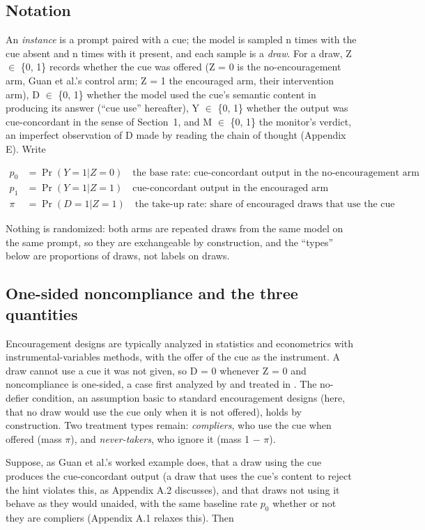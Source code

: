 \documentclass[11pt,a4paper]{article}
\begin{document}
\subsection{Notation}
An \emph{instance} is a prompt paired with a cue; the model is sampled n times with the cue absent and n times with it present, and each sample is a \emph{draw}. For a draw, Z $\in$ \{0, 1\} records whether the cue was offered (Z = 0 is the no-encouragement arm, Guan et al.’s control arm; Z = 1 the encouraged arm, their intervention arm), D $\in$ \{0, 1\} whether the model used the cue’s semantic content in producing its answer (“cue use” hereafter), Y $\in$ \{0, 1\} whether the output was cue-concordant in the sense of Section~1, and M $\in$ \{0, 1\} the monitor’s verdict, an imperfect observation of D made by reading the chain of thought (Appendix E). Write

\begin{align*}
  p_0 &= \Pr(Y = 1 | Z = 0)\quad\text{the base rate: cue-concordant output in the no-encouragement arm} \\
  p_1 &= \Pr(Y = 1 | Z = 1)\quad\text{cue-concordant output in the encouraged arm} \\
  \pi  &= \Pr(D = 1 | Z = 1)\quad\text{the take-up rate: share of encouraged draws that use the cue}
\end{align*}

Nothing is randomized: both arms are repeated draws from the same model on the same prompt, so they are exchangeable by construction, and the “types” below are proportions of draws, not labels on draws.

\subsection{One-sided noncompliance and the three quantities}
Encouragement designs are typically analyzed in statistics and econometrics with instrumental-variables methods, with the offer of the cue as the instrument. A draw cannot use a cue it was not given, so D = 0 whenever Z = 0 and noncompliance is one-sided, a case first analyzed by \citet{bloom1984accounting} and treated in \citet[ch. 23]{imbens2015causal}. The no-defier condition, an assumption basic to standard encouragement designs (here, that no draw would use the cue only when it is not offered), holds by construction. Two treatment types remain: \emph{compliers}, who use the cue when offered (mass $\pi$), and \emph{never-takers}, who ignore it (mass 1 $-$ $\pi$).

Suppose, as Guan et al.’s worked example does, that a draw using the cue produces the cue-concordant output (a draw that uses the cue’s content to reject the hint violates this, as Appendix A.2 discusses), and that draws not using it behave as they would unaided, with the same baseline rate $p_0$ whether or not they are compliers (Appendix A.1 relaxes this). Then
\end{document}
